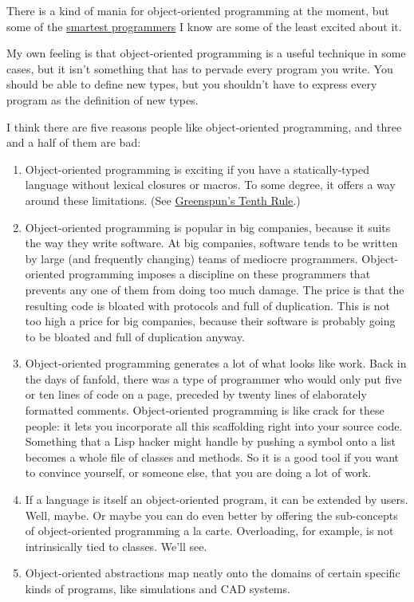 There is a kind of mania for object-oriented programming at the moment,
but some of the \href{reesoo.html}{smartest programmers} I know are some
of the least excited about it.

My own feeling is that object-oriented programming is a useful technique
in some cases, but it isn't something that has to pervade every program
you write. You should be able to define new types, but you shouldn't
have to express every program as the definition of new types.

I think there are five reasons people like object-oriented programming,
and three and a half of them are bad:

\begin{enumerate}
\def\labelenumi{\arabic{enumi}.}
\item
  Object-oriented programming is exciting if you have a statically-typed
  language without lexical closures or macros. To some degree, it offers
  a way around these limitations. (See \href{quotes.html}{Greenspun's
  Tenth Rule}.)
\item
  Object-oriented programming is popular in big companies, because it
  suits the way they write software. At big companies, software tends to
  be written by large (and frequently changing) teams of mediocre
  programmers. Object-oriented programming imposes a discipline on these
  programmers that prevents any one of them from doing too much damage.
  The price is that the resulting code is bloated with protocols and
  full of duplication. This is not too high a price for big companies,
  because their software is probably going to be bloated and full of
  duplication anyway.
\item
  Object-oriented programming generates a lot of what looks like work.
  Back in the days of fanfold, there was a type of programmer who would
  only put five or ten lines of code on a page, preceded by twenty lines
  of elaborately formatted comments. Object-oriented programming is like
  crack for these people: it lets you incorporate all this scaffolding
  right into your source code. Something that a Lisp hacker might handle
  by pushing a symbol onto a list becomes a whole file of classes and
  methods. So it is a good tool if you want to convince yourself, or
  someone else, that you are doing a lot of work.
\item
  If a language is itself an object-oriented program, it can be extended
  by users. Well, maybe. Or maybe you can do even better by offering the
  sub-concepts of object-oriented programming a la carte. Overloading,
  for example, is not intrinsically tied to classes. We'll see.
\item
  Object-oriented abstractions map neatly onto the domains of certain
  specific kinds of programs, like simulations and CAD systems.
\end{enumerate}

